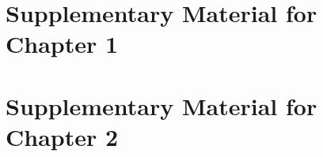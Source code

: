 \documentclass[12pt,letterpaper,oneside,final]{memoir}
\begin{document}
\begin{appendices}

\appendix
{}

\chapter{Supplementary Material for Chapter 1} \label{sec:Appendix1}

  
  

\chapter{Supplementary Material for Chapter 2} \label{sec:Appendix2}

  
  

\newpage
\clearpage

\end{appendices}

\newpage

\clearpage

\backmatter


  \begin{OnehalfSpace}
    
    
  \end{OnehalfSpace}
\end{document}
